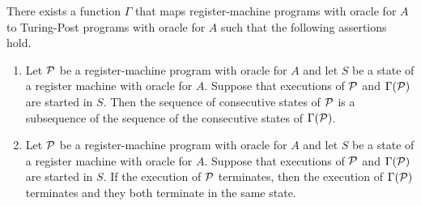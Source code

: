 \documentclass[10pt]{amsart}
\begin{document}
\begin{theorem}\label{theorem:TuringPost_simulation_of_register_machine}
	There exists a function $\Gamma$ that maps register-machine programs with oracle for $A$ to Turing-Post programs with oracle for $A$ such that the following assertions hold.
	\begin{enumerate}[label=\emph{\textbf{(\arabic*)}}, leftmargin=3.0em]
		\item Let ${\mathcal P}$ be a register-machine program with oracle for $A$ and let $S$ be a state of a register machine with oracle for $A$. Suppose that executions of ${\mathcal P}$ and $\Gamma({\mathcal P})$ are started in $S$. Then the sequence of consecutive states of ${\mathcal P}$ is a subsequence of the sequence of the consecutive states of $\Gamma({\mathcal P})$.
		\item Let ${\mathcal P}$ be a register-machine program with oracle for $A$ and let $S$ be a state of a register machine with oracle for $A$. Suppose that executions of ${\mathcal P}$ and $\Gamma({\mathcal P})$ are started in $S$. If the execution of ${\mathcal P}$ terminates, then the execution of $\Gamma({\mathcal P})$ terminates and they both terminate in the same state.
	\end{enumerate}
\end{theorem}
\end{document}
